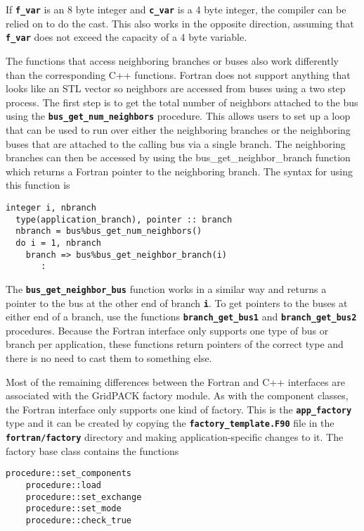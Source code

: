 If \texttt{\textbf{f\_var}} is an 8 byte integer and \texttt{\textbf{c\_var}} is a 4 byte integer, the compiler can be relied on to do the cast. This also works in the opposite direction, assuming that \texttt{\textbf{f\_var}} does not exceed the capacity of a 4 byte variable.

The functions that access neighboring branches or buses also work differently than the corresponding C++ functions. Fortran does not support anything that looks like an STL vector so neighbors are accessed from buses using a two step process. The first step is to get the total number of neighbors attached to the bus using the \texttt{\textbf{bus\_get\_num\_neighbors}} procedure. This allows users to set up a loop that can be used to run over either the neighboring branches or the neighboring buses that are attached to the calling bus via a single branch. The neighboring branches can then be accessed by using the bus\_get\_neighbor\_branch function which returns a Fortran pointer to the neighboring branch. The syntax for using this function is

{
\color{red}
\begin{Verbatim}[fontseries=b]
  integer i, nbranch
  type(application_branch), pointer :: branch
  nbranch = bus%bus_get_num_neighbors()
  do i = 1, nbranch
    branch => bus%bus_get_neighbor_branch(i)
       :
\end{Verbatim}
}

The \texttt{\textbf{bus\_get\_neighbor\_bus}} function works in a similar way and returns a pointer to the bus at the other end of branch \texttt{\textbf{i}}. To get pointers to the buses at either end of a branch, use the functions \texttt{\textbf{branch\_get\_bus1}} and \texttt{\textbf{branch\_get\_bus2}} procedures. Because the Fortran interface only supports one type of bus or branch per application, these functions return pointers of the correct type and there is no need to cast them to something else.

Most of the remaining differences between the Fortran and C++ interfaces are associated with the GridPACK factory module. As with the component classes, the Fortran interface only supports one kind of factory. This is the \texttt{\textbf{app\_factory}} type and it can be created by copying the \texttt{\textbf{factory\_template.F90}} file in the \texttt{\textbf{fortran/factory}} directory and making application-specific changes to it. The factory base class contains the functions

{
\color{red}
\begin{Verbatim}[fontseries=b]
    procedure::set_components
    procedure::load
    procedure::set_exchange
    procedure::set_mode
    procedure::check_true
\end{Verbatim}
}


